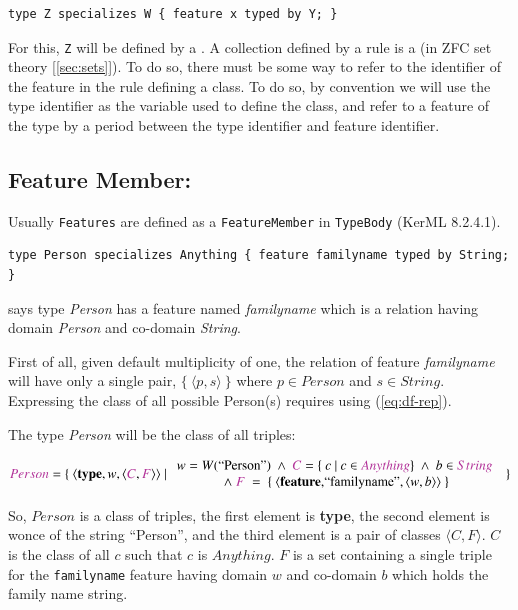 \begin{lstlisting}
type Z specializes W { feature x typed by Y; }
\end{lstlisting}

\pn For this, \texttt{Z} will be defined by a .  A collection defined by a rule is a  (in ZFC set theory [\ref{sec:sets}]).
To do so, there must be some way to refer to the identifier of the feature in the rule defining a class.  To do so, by convention we will use the type identifier as the variable used to define the class, and refer to a feature of the type by a period between the type identifier and feature identifier.


\subsection{Feature Member:}  
\pn Usually \texttt{Features} are defined as a \texttt{FeatureMember} in \texttt{TypeBody} (KerML 8.2.4.1).

\begin{lstlisting}
type Person specializes Anything { feature familyname typed by String; }
\end{lstlisting}
says type \emph{Person} has a feature named \emph{familyname} which is a relation having domain \emph{Person} and co-domain \emph{String}.

\pn First of all, given default multiplicity of one, the relation of feature \emph{familyname} will have only a single pair, $\{~\langle p,s\rangle~\}$ where $p \in Person$ and $s \in String$.
Expressing the class of all possible Person(s) requires using (\ref{eq:df-rep}).

\pn The type \emph{Person} will be the class of all triples:

\[ 
\mc{Person}=\{~\langle$\textbf{type}$,w,\langle \mc{C},\mc{F}\rangle\rangle~\vert~
\begin{array}{c}
w=W($``Person''$)~\wedge~  \mc{C}= \{~c~\vert ~c\in \mc{Anything}\}~\wedge~b \in \mc{String}~\\
\wedge~ \mc{F}~=~\{ ~\langle$\textbf{feature}$,$``familyname''$,\langle w,b\rangle\rangle~\}
\end{array}
 ~\} 
\]

\pn So, $Person$ is a class of triples, the first element is \textbf{type}, the second element is wonce of the string ``Person'', and the third element is a pair of classes $\langle C,F\rangle$.  $C$ is the class of all $c$ such that $c$ is $Anything$.
$F$ is a set containing a single triple for the \texttt{familyname} feature having domain $w$ and co-domain $b$ which holds the family name string.

